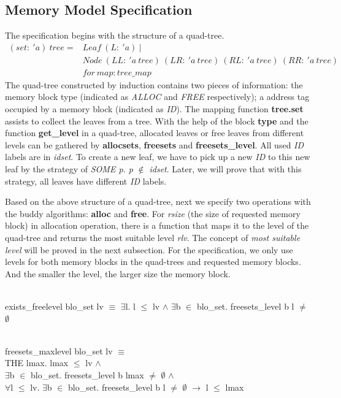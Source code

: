 \documentclass[runningheads]{llncs}
\begin{document}
\subsection{Memory Model Specification}
The specification begins with the structure of a quad-tree.
\begin{align*}
(set:\ 'a)\ tree = &Leaf\ (L:\ 'a)\ | \\
&Node\ (LL:\ 'a\ tree)\ (LR:\ 'a\ tree)\ (RL:\ 'a\ tree)\ (RR:\ 'a\ tree) \\
&for\ map: tree\_map
\end{align*}
The quad-tree constructed by induction contains two pieces of information: the memory block type (indicated as \emph{ALLOC} and \emph{FREE} respectively); a address tag occupied by a memory block (indicated as \emph{ID}). The mapping function \textbf{tree.set} assists to collect the leaves from a tree. With the help of the block \textbf{type} and the function \textbf{get\_level} in a quad-tree, allocated leaves or free leaves from different levels can be gathered by \textbf{allocsets}, \textbf{freesets} and \textbf{freesets\_level}. All used \emph{ID} labels are in \emph{idset}. To create a new leaf, we have to pick up a new \emph{ID} to this new leaf by the strategy of \emph{SOME p. p} $\notin$ \emph{idset}. Later, we will prove that with this strategy, all leaves have different \emph{ID} labels.

Based on the above structure of a quad-tree, next we specify two operations with the buddy algorithms: \textbf{alloc} and \textbf{free}. For \emph{rsize} (the size of requested memory block) in allocation operation, there is a function that maps it to the level of the quad-tree and returns the most suitable level \emph{rlv}. The concept of \emph{most suitable level} will be proved in the next subsection. For the specification, we only use levels for both memory blocks in the quad-trees and requested memory blocks. And the smaller the level, the larger size the memory block.

\begin{definition}  \\
exists\_freelevel blo\_set lv $\equiv$ $\exists$l. l $\leq$ lv $\wedge$ $\exists$b $\in$ blo\_set. freesets\_level b l $\ne$ $\emptyset$
\end{definition}

\begin{definition}  \\
freesets\_maxlevel blo\_set lv $\equiv$ \\
\phantom{x} \hspace{10pt} THE lmax. lmax $\leq$ lv $\wedge$ \\
\phantom{x} \hspace{60pt} $\exists$b $\in$ blo\_set. freesets\_level b lmax $\neq$ $\emptyset$ $\wedge$ \\
\phantom{x} \hspace{60pt} $\forall$l $\leq$ lv. $\exists$b $\in$ blo\_set. freesets\_level b l $\ne$ $\emptyset$ $\longrightarrow$ l $\leq$ lmax
\end{definition}
\end{document}
